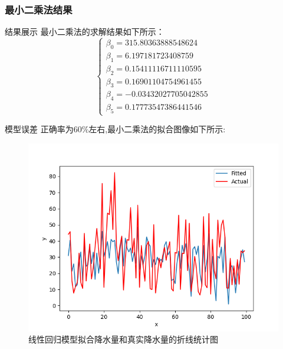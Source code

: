 \documentclass[10pt]{beamer}
\begin{document}
\begin{frame}
	\frametitle{最小二乘法结果}
	\begin{block}{结果展示}
		最小二乘法的求解结果如下所示：
		\begin{equation}
			\begin{cases}
				\beta_0 = 315.80363888548624   \\
				\beta_1 = 6.197181723408759    \\
				\beta_2 = 0.15411116711110595  \\
				\beta_3 = 0.16901104754961455  \\
				\beta_4 = -0.03432027705042855 \\
				\beta_5 = 0.17773547386441546
			\end{cases}
		\end{equation}
	\end{block}
	\begin{block}{模型误差}
		正确率为$60\%$左右,最小二乘法的拟合图像如下所示:
		\begin{figure}[h!]
			\centering
			\includegraphics[scale=0.2]{../src/try_match/ols_five.png}
			\caption{线性回归模型拟合降水量和真实降水量的折线统计图}
		\end{figure}
	\end{block}
\end{frame}
\end{document}
